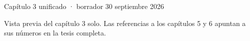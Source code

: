 \documentclass[spanish,a4paper,12pt]{article}
\begin{document}
\begin{center}\Large Capítulo 3 unificado · borrador 30 septiembre 2026\end{center}
\noindent Vista previa del capítulo 3 solo. Las referencias a los capítulos 5 y 6 apuntan
a sus números en la tesis completa.
\setcounter{section}{2}

\printbibliography
\end{document}
